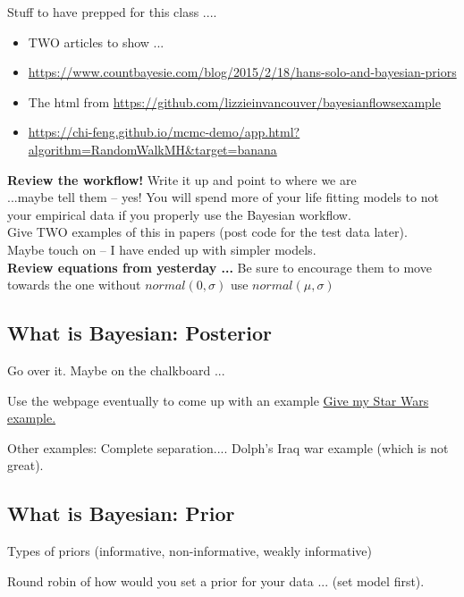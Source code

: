 \documentclass[11pt]{article}
\begin{document}
Stuff to have prepped for this class ....
\begin{itemize}
\item TWO articles to show ...
\item \url{https://www.countbayesie.com/blog/2015/2/18/hans-solo-and-bayesian-priors}
\item The html from \url{https://github.com/lizzieinvancouver/bayesianflowsexample}
\item \url{https://chi-feng.github.io/mcmc-demo/app.html?algorithm=RandomWalkMH&target=banana}
\end{itemize}

{\bf Review the workflow!} Write it up  and point to where we are \\
...maybe tell them -- yes! 
You will spend more of your life fitting models to not your empirical data if you properly use the Bayesian workflow.\\
Give TWO examples of this in papers (post code for the test data later). \\ %
Maybe touch on -- I have ended up with simpler models. \\

{\bf Review equations from yesterday ...}
Be sure to encourage them to move towards the one without $normal(0, \sigma)$  use $normal(\mu, \sigma)$

\subsection{What is Bayesian: Posterior}
Go over it. Maybe on the chalkboard ...  

Use the webpage eventually to come up with an example
\href{https://www.countbayesie.com/blog/2015/2/18/hans-solo-and-bayesian-priors}{Give my Star Wars example.}


Other examples: Complete separation.... Dolph's Iraq war example (which is not great).

\subsection{What is Bayesian: Prior}

Types of priors (informative, non-informative, weakly informative)

Round robin of how would you set a prior for your data ... (set model first).
\end{document}
